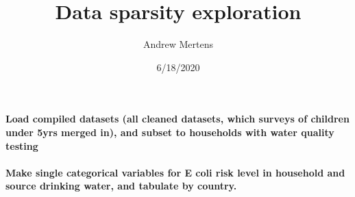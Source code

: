 \documentclass[
]{article}
\title{Data sparsity exploration}
\author{Andrew Mertens}
\date{6/18/2020}
\newenvironment{Shaded}{\begin{snugshade}}{\end{snugshade}}
\newcommand{\DecValTok}[1]{\textcolor[rgb]{0.00,0.00,0.81}{#1}}
\newcommand{\KeywordTok}[1]{\textcolor[rgb]{0.13,0.29,0.53}{\textbf{#1}}}
\newcommand{\NormalTok}[1]{#1}
\newcommand{\OperatorTok}[1]{\textcolor[rgb]{0.81,0.36,0.00}{\textbf{#1}}}
\newcommand{\StringTok}[1]{\textcolor[rgb]{0.31,0.60,0.02}{#1}}
\begin{document}
\maketitle

\hypertarget{load-compiled-datasets-all-cleaned-datasets-which-surveys-of-children-under-5yrs-merged-in-and-subset-to-households-with-water-quality-testing}{%
\paragraph{Load compiled datasets (all cleaned datasets, which surveys
of children under 5yrs merged in), and subset to households with water
quality
testing}\label{load-compiled-datasets-all-cleaned-datasets-which-surveys-of-children-under-5yrs-merged-in-and-subset-to-households-with-water-quality-testing}}

\begin{Shaded}
\end{Shaded}

\hypertarget{make-single-categorical-variables-for-e-coli-risk-level-in-household-and-source-drinking-water-and-tabulate-by-country.}{%
\paragraph{Make single categorical variables for E coli risk level in
household and source drinking water, and tabulate by
country.}\label{make-single-categorical-variables-for-e-coli-risk-level-in-household-and-source-drinking-water-and-tabulate-by-country.}}
\end{document}
